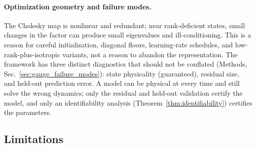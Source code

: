 \documentclass[11pt]{article}
\begin{document}
\paragraph{Optimization geometry and failure modes.}
The Cholesky map is nonlinear and redundant; near rank-deficient states, small changes in the factor can produce small eigenvalues and ill-conditioning. This is a reason for careful initialization, diagonal floors, learning-rate schedules, and low-rank-plus-isotropic variants, not a reason to abandon the representation. The framework has three distinct diagnostics that should not be conflated (Methods, Sec.~\ref{sec:gauge_failure_modes}): state physicality (guaranteed), residual size, and held-out prediction error. A model can be physical at every time and still solve the wrong dynamics; only the residual and held-out validation certify the model, and only an identifiability analysis (Theorem~\ref{thm:identifiability}) certifies the parameters.

\subsection{Limitations}
\label{sec:limitations}
\end{document}
